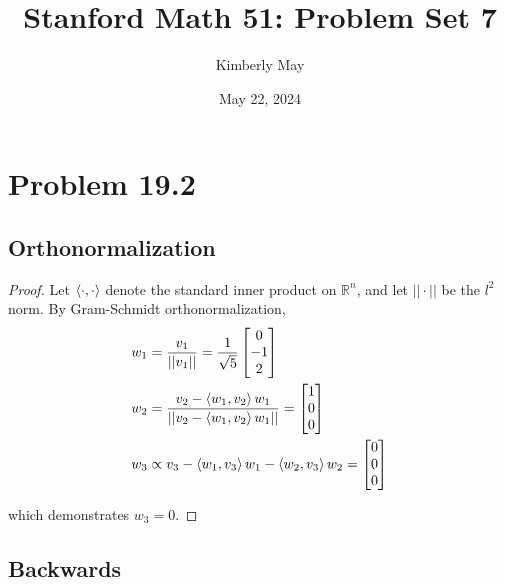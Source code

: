 \documentclass{article}
\title{Stanford Math 51: Problem Set 7}
\author{Kimberly May}
\date{May 22, 2024}
\theoremstyle{named}
\begin{document}
\maketitle

\section{Problem 19.2}

\subsection{Orthonormalization}

\begin{proof}
    Let $\braket{\cdot, \cdot}$ denote the standard inner product on $\mathbb{R}^n$, and let $||\cdot||$ be the $l^2$ norm. By Gram-Schmidt orthonormalization,
\begin{align*}
    w_1 &= \frac{v_1}{||v_1||} = \frac{1}{\sqrt{5}} \begin{bmatrix} 0 \\ -1 \\ 2 \end{bmatrix} \\
    w_2 &= \frac{v_2 - \braket{w_1, v_2}w_1}{||v_2 - \braket{w_1, v_2}w_1||} = \begin{bmatrix}1 \\ 0 \\ 0\end{bmatrix} \\
    w_3 &\propto v_3 - \braket{w_1, v_3}w_1 - \braket{w_2, v_3}w_2 = \begin{bmatrix} 0 \\ 0 \\ 0 \end{bmatrix}
\end{align*}

which demonstrates $w_3 = 0$. 
\end{proof}

\subsection{Backwards}
\end{document}
